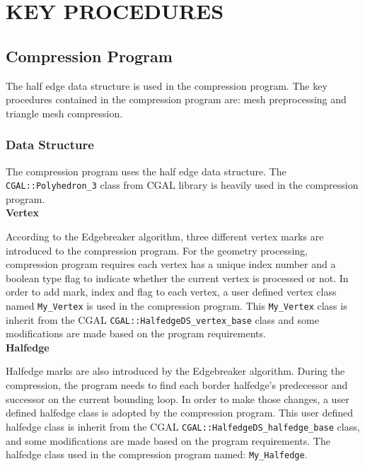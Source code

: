 \documentclass[onecolumn, 12pt]{article}
\begin{document}
\section{KEY PROCEDURES}
\subsection{Compression Program}
The half edge data structure is used in the compression program. The key procedures contained in the compression program are: mesh preprocessing and triangle mesh compression.


\subsubsection{Data Structure}
The compression program uses the half edge data structure. The \lstinline!CGAL::Polyhedron_3! class from CGAL library is heavily used in the compression program.\\

{\setlength\parindent{0pt}
\textbf{Vertex}\vspace{0.5em}}

According to the Edgebreaker algorithm, three different vertex marks are introduced to the compression program. For the geometry processing, compression program requires each vertex has a unique index number and a boolean type flag to indicate whether the current vertex is processed or not. In order to add mark, index and flag to each vertex, a user defined vertex class named \lstinline!My_Vertex! is used in the compression program. This \lstinline!My_Vertex! class is inherit from the CGAL \lstinline!CGAL::HalfedgeDS_vertex_base! class and some modifications are made based on the program requirements. \\

{\setlength\parindent{0pt}
\textbf{Halfedge}\vspace{0.5em}}

Halfedge marks are also introduced by the Edgebreaker algorithm. During the compression, the program needs to find each border halfedge's predecessor and successor on the current bounding loop. In order to make those changes, a user defined halfedge class is adopted by the compression program. This user defined halfedge class is inherit from the CGAL \lstinline!CGAL::HalfedgeDS_halfedge_base! class, and some modifications are made based on the program requirements. The halfedge class used in the compression program named: \lstinline!My_Halfedge!. \\
\end{document}
